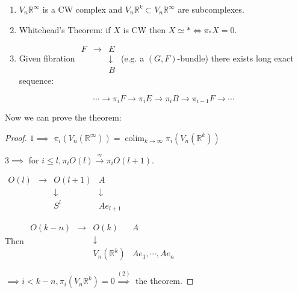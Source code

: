 \documentclass{article}
\theoremstyle{definition}
\begin{document}
    \begin{enumerate}[label=\arabic*)]
        \item \(V_n \mathbb{R}^{\infty}\) is a CW complex and \(V_n \mathbb{R}^k \subset V_n \mathbb{R}^{\infty}\) are subcomplexes.
        \item Whitehead's Theorem: if \(X\) is CW then \(X\simeq \ast \iff \pi_{\ast} X = 0\).
        \item Given fibration \(\begin{matrix} F & \to & E \\ & & \downarrow \\ & & B\end{matrix}\) (e.g. a \((G,F)\)-bundle) there exists long exact sequence:
        
        \[
            \cdots \to \pi_i F \to \pi_i E \to \pi_i B \to \pi_{i-1} F \to \cdots
        \]
    \end{enumerate} 

    Now we can prove the theorem:

    \begin{proof}
        \(1\implies\)  \(\pi_i(V_n(\mathbb{R}^{\infty})) = \operatorname{colim}_{k \to \infty} \pi_i(V_n(\mathbb{R}^k))\)  

        \(3 \implies\) for \(i \leq l, \pi_i O(l) \xrightarrow{\approx} \pi_i O(l+1)\).
        
        \(\begin{matrix}O(l) & \to & O(l+1) & A \\ & & \downarrow & \downarrow \\ & & S^l & A e_{l+1}\end{matrix}\)

        Then \(\begin{matrix}O(k-n) & \to & O(k) & A \\ & & \downarrow \\ & & V_n(\mathbb{R}^k) & A e_1, \cdots , A e_n\end{matrix}\) 

        \(\implies i < k-n, \pi_i (V_n \mathbb{R}^k) = 0 \overset{(2)}{\implies} \) the theorem. 
    \end{proof}
\end{document}
